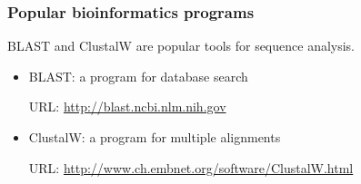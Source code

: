 %
%
\subsubsection*{Popular bioinformatics programs}
BLAST and ClustalW are popular tools for sequence analysis.
\begin{itemize}
\item BLAST: a program for database search

URL: \url{http://blast.ncbi.nlm.nih.gov}

\item ClustalW: a program for multiple alignments

URL: \url{http://www.ch.embnet.org/software/ClustalW.html}

\end{itemize}

